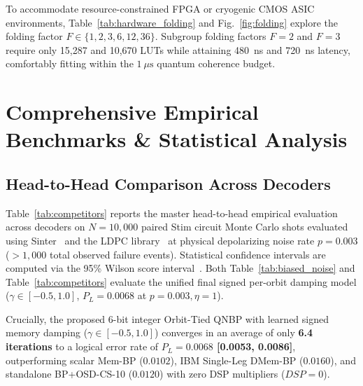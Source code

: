 \documentclass[journal]{IEEEtran}
\begin{document}
To accommodate resource-constrained FPGA or cryogenic CMOS ASIC environments, Table~\ref{tab:hardware_folding} and Fig.~\ref{fig:folding} explore the folding factor $F \in \{1, 2, 3, 6, 12, 36\}$. Subgroup folding factors $F=2$ and $F=3$ require only 15,287 and 10,670 LUTs while attaining 480~ns and 720~ns latency, comfortably fitting within the $1~\mu\text{s}$ quantum coherence budget.

\section{Comprehensive Empirical Benchmarks \& Statistical Analysis}



\subsection{Head-to-Head Comparison Across Decoders}
Table~\ref{tab:competitors} reports the master head-to-head empirical evaluation across decoders on $N=10,000$ paired Stim circuit Monte Carlo shots evaluated using Sinter~\cite{gidney2021sinter} and the LDPC library~\cite{roffe2022ldpc,ibm2025relaybp} at physical depolarizing noise rate $p = 0.003$ ($>1,000$ total observed failure events). Statistical confidence intervals are computed via the 95\% Wilson score interval~\cite{wilson1927probable}. Both Table~\ref{tab:biased_noise} and Table~\ref{tab:competitors} evaluate the unified final signed per-orbit damping model ($\gamma \in [-0.5, 1.0]$, $P_L = 0.0068$ at $p=0.003, \eta=1$).

Crucially, the proposed 6-bit integer Orbit-Tied QNBP with learned signed memory damping ($\gamma \in [-0.5, 1.0]$) converges in an average of only \textbf{6.4 iterations} to a logical error rate of \textbf{$P_L = 0.0068$ [0.0053, 0.0086]}, outperforming scalar Mem-BP ($0.0102$), IBM Single-Leg DMem-BP ($0.0160$), and standalone BP+OSD-CS-10 ($0.0120$) with zero DSP multipliers ($DSP=0$).
\end{document}
